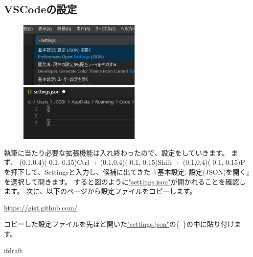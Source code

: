 		\subsection{VSCodeの設定}
			\begin{figure}
				\centering
				\includegraphics[width=60mm,trim=0 30 50 0,clip]{VSCode-setting-dialog.png}

				\vspace{2.5mm}
				
				\includegraphics[width=60mm]{VSCode-setting-json.png}
			\end{figure}
			執筆に当たり必要な拡張機能は入れ終わったので、設定をしていきます。
			まず、
			(0.1,0.4)(-0.1,-0.15)Ctrl~+
			(0.1,0.4)(-0.1,-0.15)Shift~+
			(0.1,0.4)(-0.1,-0.15)P
			を押下して、Settingsと入力し、候補に出てきた『基本設定: 設定(JSON)を開く』を選択して開きます。
			すると図のように\url{"settings.json"}が開かれることを確認します。
			次に、以下のページから設定ファイルをコピーします。
			\begin{mdframed}[style=shadow]
				\url{https://gist.github.com/}
			\end{mdframed}
			コピーした設定ファイルを先ほど開いた\url{"settings.json"}の\{~\}の中に貼り付けます。

			\expandafter\ifx\csname ifdraft\endcsname\relax

\fi
